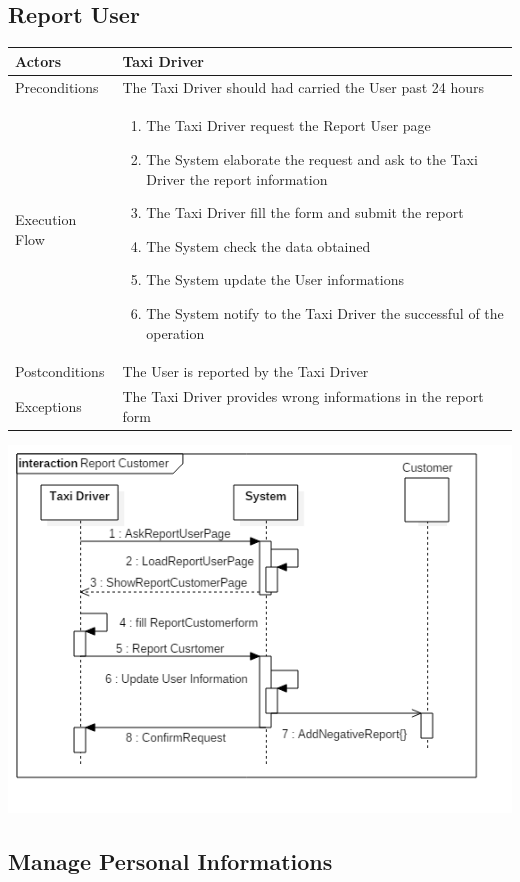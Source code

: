 \documentclass[english]{article}
\begin{document}
\subsection{Report User}

\begin{tabular}{lp{8cm}}
\hline
Actors & Taxi Driver \\
\hline
Preconditions & The Taxi Driver should had carried the User past 24 hours \\
\hline
Execution Flow &  
		\begin{enumerate}
			\item The Taxi Driver request the Report User page
			\item The System elaborate the request and ask to the Taxi Driver the report information
			\item The Taxi Driver fill the form and submit the report
			\item The System check the data obtained
			\item The System update the User informations
			\item The System notify to the Taxi Driver the successful of the operation
		\end{enumerate} 
	\\ 
\hline
Postconditions & The User is reported by the Taxi Driver \\
\hline
Exceptions & The Taxi Driver provides wrong informations in the report form
\end{tabular}

\includegraphics[width=\textwidth]{ReportUser}

\subsection{Manage Personal Informations}
\end{document}
